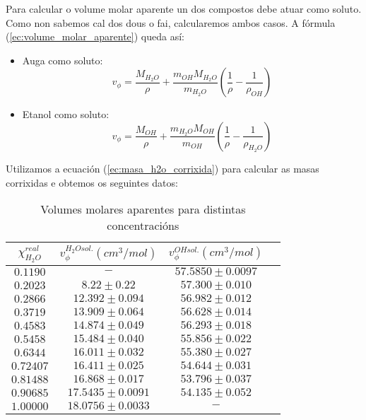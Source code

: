 \documentclass[12pt, a4paper, titlepage]{article}
\begin{document}
  Para calcular o volume molar aparente un dos compostos debe atuar como soluto. Como non sabemos cal dos dous o fai, calcularemos ambos casos. A fórmula (\ref{ec:volume_molar_aparente}) queda así:

  \begin{itemize}
    \setlength\itemsep{-4pt}
    \item Auga como soluto:
          \begin{equation*}
            v_\phi = \frac{M_{H_2O}}{\rho} + \frac{m_{OH} M_{H_2O}}{m_{H_2O}} \left( \frac{1}{\rho} - \frac{1}{\rho_{OH}} \right)
          \end{equation*}
    \item Etanol como soluto:
          \begin{equation*}
            v_\phi = \frac{M_{OH}}{\rho} + \frac{m_{H_2O}M_{OH}}{m_{OH}} \left( \frac{1}{\rho} - \frac{1}{\rho_{H_2O}} \right)
          \end{equation*}
  \end{itemize}

  Utilizamos a ecuación (\ref{ec:masa_h2o_corrixida}) para calcular as masas corrixidas e obtemos os seguintes datos:

  \begin{table}[H]
    \centering
    \begin{tabular}{|c|c|c|c|}
    \hline
    $\chi_{H_2O}^{real}$ & $v_\phi^{H_2O sol.} (cm^3/mol)$ & $v_\phi^{OH sol.} (cm^3/mol)$ \\ \hline
    $0.1190 $  & $ - $  &  $ 57.5850 \pm 0.0097 $ \\ \hline
    $0.2023 $  & $ 8.22 \pm 0.22 $  &  $ 57.300 \pm 0.010 $ \\ \hline
    $0.2866 $  & $ 12.392 \pm 0.094 $  &  $ 56.982 \pm 0.012 $ \\ \hline
    $0.3719 $  & $ 13.909 \pm 0.064 $  &  $ 56.628 \pm 0.014 $ \\ \hline
    $0.4583 $  & $ 14.874 \pm 0.049 $  &  $ 56.293 \pm 0.018 $ \\ \hline
    $0.5458 $  & $ 15.484 \pm 0.040 $  &  $ 55.856 \pm 0.022 $ \\ \hline
    $0.6344 $  & $ 16.011 \pm 0.032 $  &  $ 55.380 \pm 0.027 $ \\ \hline
    $0.72407 $ & $ 16.411 \pm 0.025 $  &  $ 54.644 \pm 0.031 $ \\ \hline
    $0.81488 $ & $ 16.868 \pm 0.017 $  &  $ 53.796 \pm 0.037 $ \\ \hline
    $0.90685 $ & $ 17.5435 \pm 0.0091 $  &  $ 54.135 \pm 0.052 $ \\ \hline
    $1.00000 $ & $ 18.0756 \pm 0.0033 $  &  $ - $ \\ \hline
    \end{tabular}
    \caption{Volumes molares aparentes para distintas concentracións}
    \label{cad:volumes_molares_aparentes_concentracions}
  \end{table}
\end{document}
